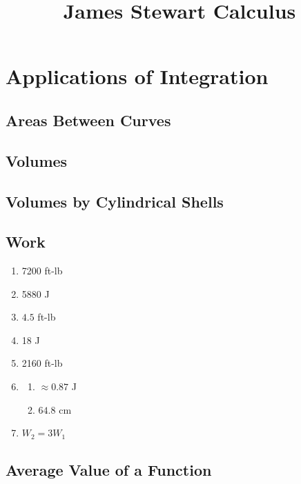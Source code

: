 \documentclass{article} \usepackage[margin=1in]{geometry}
\title{James Stewart Calculus} \author{} \date{}
\begin{document}
\maketitle
\setcounter{section}{4}
\section{Applications of Integration}
\subsection{Areas Between Curves}
\subsection{Volumes}
\subsection{Volumes by Cylindrical Shells}
\subsection{Work}
\begin{enumerate}
	\item 7200 ft-lb
	\item 5880 J
	\item $4.5$ ft-lb
	      \setcounter{enumi}{4}
	\item 18 J
	      \setcounter{enumi}{6}
	\item 2160 ft-lb
	      \setcounter{enumi}{8}
	\item \begin{enumerate}
		      \item $\approx0.87$ J
		      \item $64.8$ cm
	      \end{enumerate}
	      \setcounter{enumi}{10}
	\item $W_2=3W_1$
\end{enumerate}

\subsection{Average Value of a Function}
\end{document}
